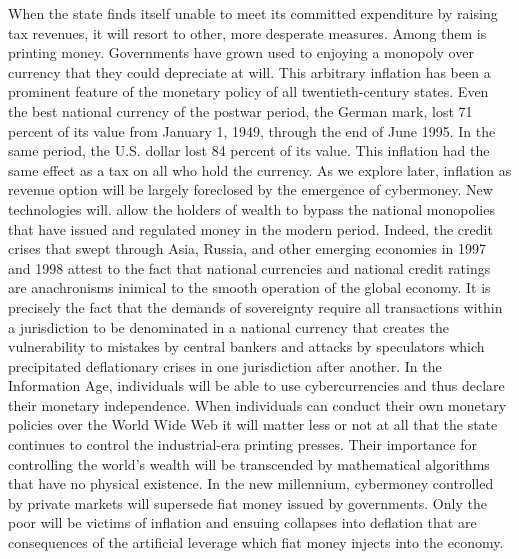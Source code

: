 \begin{Parallel}{97mm}{45mm}
  \ParallelLText
  { When the state finds itself unable to meet its committed expenditure by raising tax revenues, it will resort to other, more desperate measures. Among them is printing money. Governments have grown used to enjoying a monopoly over currency that they could depreciate at will. This arbitrary inflation has been a prominent feature of the monetary policy of all twentieth-century states. Even the best national currency of the postwar period, the German mark, lost 71 percent of its value from January 1, 1949, through the end of June 1995. In the same period, the U.S. dollar lost 84 percent of its value. This inflation had the same effect as a tax on all who hold the currency. As we explore later, inflation as revenue option will be largely foreclosed by the emergence of cybermoney. New technologies will. allow the holders of wealth to bypass the national monopolies that have issued and regulated money in the modern period. Indeed, the credit crises that swept through Asia, Russia, and other emerging economies in 1997 and 1998 attest to the fact that national currencies and national credit ratings are anachronisms inimical to the smooth operation of the global economy. It is precisely the fact that the demands of sovereignty require all transactions within a jurisdiction to be denominated in a national currency that creates the vulnerability to mistakes by central bankers and attacks by speculators which precipitated deflationary crises in one jurisdiction after another. In the Information Age, individuals will be able to use cybercurrencies and thus declare their monetary independence. When individuals can conduct their own monetary policies over the World Wide Web it will matter less or not at all that the state continues to control the industrial-era printing presses. Their importance for controlling the world's wealth will be transcended by mathematical algorithms that have no physical existence. In the new millennium, cybermoney controlled by private markets will supersede fiat money issued by governments. Only the poor will be victims of inflation and ensuing collapses into deflation that are consequences of the artificial leverage which fiat money injects into the economy. }
  

\end{Parallel}
